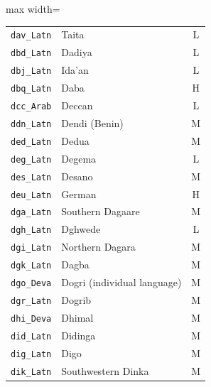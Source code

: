 {\begin{adjustbox}{max width=\textwidth}
\begin{tabular}{llc}
        \texttt{dav\_Latn} & Taita & L \\
        \texttt{dbd\_Latn} & Dadiya & L \\
        \texttt{dbj\_Latn} & Ida'an & L \\
        \texttt{dbq\_Latn} & Daba & H \\
        \texttt{dcc\_Arab} & Deccan & L \\
        \texttt{ddn\_Latn} & Dendi (Benin) & M \\
        \texttt{ded\_Latn} & Dedua & M \\
        \texttt{deg\_Latn} & Degema & L \\
        \texttt{des\_Latn} & Desano & M \\
        \texttt{deu\_Latn} & German & H \\
        \texttt{dga\_Latn} & Southern Dagaare & M \\
        \texttt{dgh\_Latn} & Dghwede & L \\
        \texttt{dgi\_Latn} & Northern Dagara & M \\
        \texttt{dgk\_Latn} & Dagba & M \\
        \texttt{dgo\_Deva} & Dogri (individual language) & M \\
        \texttt{dgr\_Latn} & Dogrib & M \\
        \texttt{dhi\_Deva} & Dhimal & M \\
        \texttt{did\_Latn} & Didinga & M \\
        \texttt{dig\_Latn} & Digo & M \\
        \texttt{dik\_Latn} & Southwestern Dinka & M \\
        \bottomrule
    \end{tabular}
    \end{adjustbox}
}

